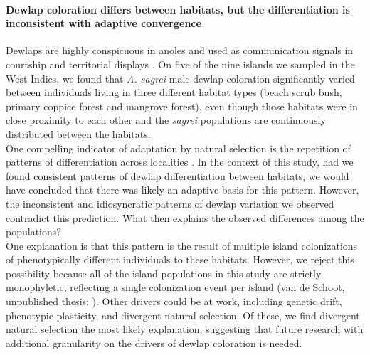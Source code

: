 
\paragraph{Dewlap coloration differs between habitats, but the differentiation is inconsistent with adaptive convergence} Dewlaps are highly conspicuous in anoles and used as communication signals in courtship \citep{Sigmund1983, Driessens2014, Driessens2015} and territorial displays \citep{Losos1985, Macedonia1994, Macedonia2013}. On five of the nine islands we sampled in the West Indies, we found that \textit{A. sagrei} male dewlap coloration significantly varied between individuals living in three different habitat types  (beach scrub bush, primary coppice forest and mangrove forest), even though those habitats were in close proximity to each other and the \textit{sagrei} populations are continuously distributed between the habitats.\\ 

One compelling indicator of adaptation by natural selection is the repetition of patterns of differentiation across localities \citep{Losos2009, Losos2011}. In the context of this study, had we found consistent patterns of dewlap differentiation between habitats, we would have concluded that there was likely an adaptive basis for this pattern. However, the inconsistent and idiosyncratic patterns of dewlap variation we observed contradict this prediction. What then explains the observed differences among the populations?\\

One explanation is that this pattern is the result of multiple island colonizations of phenotypically different individuals to these habitats. However, we reject this possibility because all of the island populations in this study are strictly monophyletic, reflecting a single colonization event per island (van de Schoot, unpublished thesis; \citealt{Driessens2017, Reynolds2020}). Other drivers could be at work, including genetic drift, phenotypic plasticity, and divergent natural selection. Of these, we find divergent natural selection the most likely explanation, suggesting that future research with additional granularity on the drivers of dewlap coloration is needed. 

